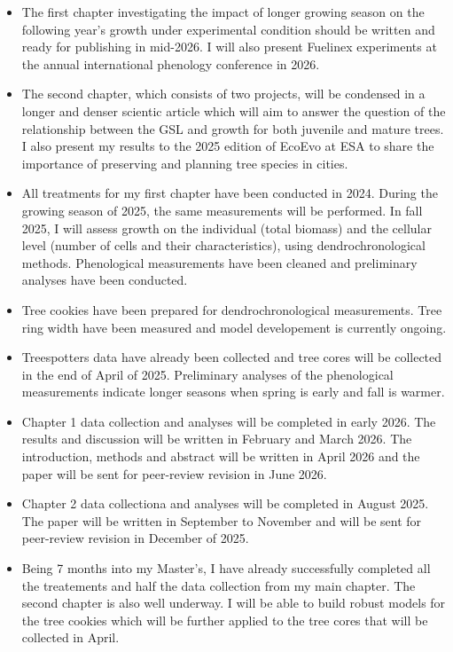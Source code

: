\documentclass[11pt,letter]{article}
\begin{document}
\begin {itemize}
	\item The first chapter investigating the impact of longer growing season on the following year's growth under experimental condition should be written and ready for publishing in mid-2026. I will also present Fuelinex experiments at the annual international phenology conference in 2026. 
	\item The second chapter, which consists of two projects, will be condensed in a longer and denser scientic article which will aim to answer the question of the relationship between the GSL and growth for both juvenile and mature trees. I also present my results to the 2025 edition of EcoEvo at ESA to share the importance of preserving and planning tree species in cities. 
\end {itemize}
\begin {itemize}
	\item All treatments for my first chapter have been conducted in 2024. During the growing season of 2025, the same measurements will be performed. In fall 2025, I will assess growth on the individual (total biomass) and the cellular level (number of cells and their characteristics), using dendrochronological methods. Phenological measurements have been cleaned and preliminary analyses have been conducted.
	\item Tree cookies have been prepared for dendrochronological measurements. Tree ring width have been measured and model developement is currently ongoing. 
	\item Treespotters data have already been collected and tree cores will be collected in the end of April of 2025. Preliminary analyses of the phenological measurements indicate longer seasons when spring is early and fall is warmer. 
\end {itemize}
\begin {itemize}
	\item Chapter 1 data collection and analyses will be completed in early 2026. The results and discussion will be written in February and March 2026. The introduction, methods and abstract will be written in April 2026 and the paper will be sent for peer-review revision in June 2026.
	\item Chapter 2 data collectiona and analyses will be completed in August 2025. The paper will be written in September to November and will be sent for peer-review revision in December of 2025.
\end {itemize}
\begin {itemize}
	\item Being 7 months into my Master's, I have already successfully completed all the treatements and half the data collection from my main chapter. The second chapter is also well underway. I will be able to build robust models for the tree cookies which will be further applied to the tree cores that will be collected in April. 
\end {itemize}


\end{document}
